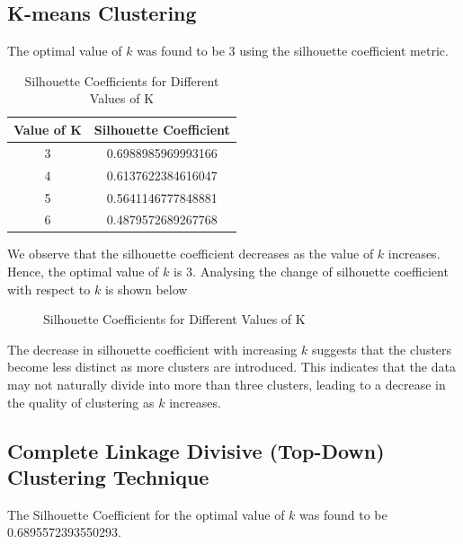 \documentclass[12pt]{article}
\begin{document}
	\subsection{K-means Clustering}
	The optimal value of $k$ was found to be 3 using the silhouette coefficient metric. 
	\begin{table}[htbp]
		\centering
		\begin{tabular}{cc}
			\toprule
			\textbf{Value of K} & \textbf{Silhouette Coefficient} \\
			\midrule
			3 & 0.6988985969993166 \\
			4 & 0.6137622384616047 \\
			5 & 0.5641146777848881 \\
			6 & 0.4879572689267768 \\
			\bottomrule
		\end{tabular}
		\caption{Silhouette Coefficients for Different Values of K}
		\label{tab:silhouette}
	\end{table}
	We observe that the silhouette coefficient decreases as the value of $k$ increases. Hence, the optimal value of $k$ is 3. Analysing the change of silhouette coefficient with respect to $k$ is shown below
	\begin{figure}[H]
		\centering
		\caption{Silhouette Coefficients for Different Values of K}
		\label{fig:silhouette_plot}
	\end{figure}
	The decrease in silhouette coefficient with increasing \( k \) suggests that the clusters become less distinct as more clusters are introduced. This indicates that the data may not naturally divide into more than three clusters, leading to a decrease in the quality of clustering as \( k \) increases.
	\subsection{Complete Linkage Divisive (Top-Down) Clustering Technique}
	The Silhouette Coefficient for the optimal value of \( k \) was found to be 0.6895572393550293.
	
\end{document}
